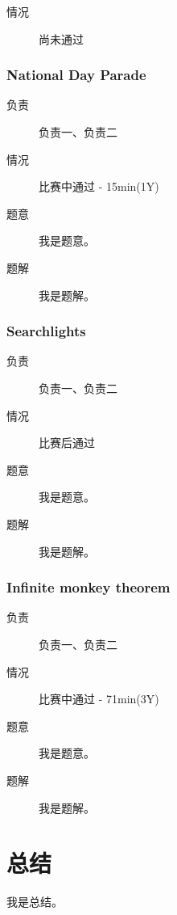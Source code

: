 \documentclass[a4paper, 11pt, nofonts, nocap, fancyhdr]{ctexart}
\newcommand{\problem}[1]{\subsubsection{#1}}
\begin{document}
\begin{description}
\item[情况] 尚未通过
\end{description}

\problem{National Day Parade}

\begin{description}
\item[负责] 负责一、负责二
\item[情况] 比赛中通过 - 15min(1Y)
\item[题意]
我是题意。
\item[题解]
我是题解。
\end{description}

\problem{Searchlights}

\begin{description}
\item[负责] 负责一、负责二
\item[情况] 比赛后通过
\item[题意]
我是题意。
\item[题解]
我是题解。
\end{description}

\problem{Infinite monkey theorem}

\begin{description}
\item[负责] 负责一、负责二
\item[情况] 比赛中通过 - 71min(3Y)
\item[题意]
我是题意。
\item[题解]
我是题解。
\end{description}

\section{总结}

我是总结。
\end{document}
